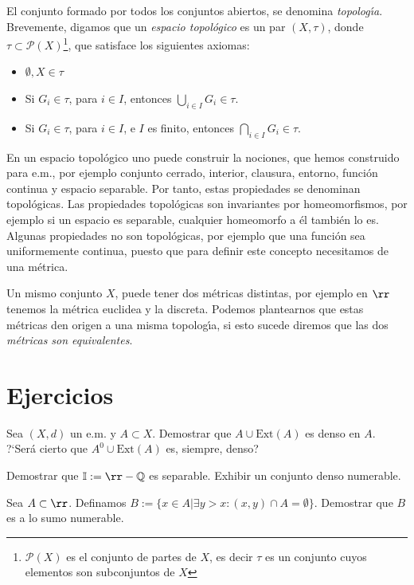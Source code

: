 El conjunto formado por todos los conjuntos abiertos, se denomina
\emph{topolog\'{\i}a}. Brevemente, digamos que un \emph{espacio
topol\'ogico} es un par $(X,\tau)$, donde $\tau\subset
\mathcal{P}(X)$\footnote{$\mathcal{P}(X)$ es el conjunto de partes
de $X$, es decir $\tau$ es un conjunto cuyos elementos son
subconjuntos de $X$}, que satisface los siguientes axiomas:
\begin{itemize}
    \item[1)] $\emptyset, X\in \tau$
    \item[2)] Si $G_i\in\tau$, para $i\in I$, entonces
    $\bigcup_{i\in I}G_i\in \tau$.
    \item[3)] Si $G_i\in\tau$, para $i\in I$, e $I$ es finito, entonces
    $\bigcap_{i\in I}G_i\in \tau$.
\end{itemize}

En un espacio topol\'ogico uno puede construir la nociones, que
hemos construido para e.m., por ejemplo conjunto cerrado,
interior, clausura,  entorno, funci\'on continua y espacio
separable. Por tanto, estas propiedades se denominan
topol\'ogicas. Las propiedades topol\'ogicas son invariantes por
homeomorfismos, por ejemplo si un espacio es separable, cualquier
homeomorfo a \'el tambi\'en lo es. Algunas propiedades no son
topol\'ogicas, por ejemplo que una funci\'on sea uniformemente
continua, puesto que para definir este concepto necesitamos de una
m\'etrica.

Un mismo conjunto $X$, puede tener dos m\'etricas distintas, por
ejemplo en $\rr$ tenemos la m\'etrica euclidea y la discreta.
Podemos plantearnos que estas m\'etricas den origen a una misma
topolog\'{\i}a, si esto sucede diremos que las dos
\emph{m\'etricas son equivalentes}.


\section{Ejercicios}

\begin{ejercicio} Sea $(X,d)$ un e.m. y $A\subset X$. Demostrar
que $A\cup \text{Ext}(A)$ es denso en $A$. ?`Ser\'a cierto que
$A^0\cup \text{Ext}(A)$ es, siempre, denso?
\end{ejercicio}

\begin{ejercicio} Demostrar que $\mathbb{I}:=\rr-\mathbb{Q}$ es
separable. Exhibir un conjunto denso numerable.
\end{ejercicio}

\begin{ejercicio} Sea $A\subset \rr$. Definamos $B:=\{x\in
A|\exists y>x: (x,y)\cap A=\emptyset\}$. Demostrar que $B$ es a lo
sumo numerable.
\end{ejercicio}

